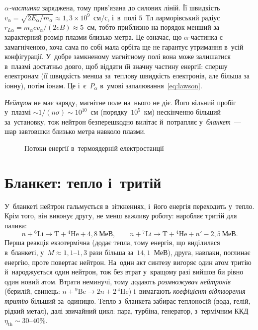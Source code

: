 \emph{$\alpha$-частинка} заряджена, тому прив'язана до силових ліній. Її швидкість
$v_\alpha=\sqrt{2E_\alpha/m_\alpha}\approx1{,}3\times10^{9}$~см/с, і~в~полі $5$~Тл
ларморівський радіус $r_{L\alpha}=m_\alpha cv_\alpha/(2eB)\approx5$~см, тобто приблизно на
порядок менший за характерний розмір плазми близько метра. Це означає, що
$\alpha$-частинка є замагніченою, хоча сама по собі мала орбіта ще не гарантує утримання
в~усій конфігурації. У~добре замкненому магнітному полі вона може залишатися в~плазмі
достатньо довго, щоб віддати їй значну частину енергії: спершу електронам (її швидкість
менша за~теплову швидкість електронів, але більша за іонну), потім іонам. Це
і~є~$P_\alpha$ в~умові запалювання~\eqref{eq:lawson}.

\emph{Нейтрон} не має заряду, магнітне поле на~нього не діє. Його вільний пробіг у~плазмі
$\sim1/(n\sigma)\sim10^{10}$~см (порядку~$10^{5}$~км) нескінченно більший за~установку,
тож нейтрон безперешкодно вилітає й~потрапляє у~\emph{бланкет}~--- шар завтовшки близько
метра навколо плазми.

\begin{figure}[h!]\centering
	\caption{Потоки енергії в~термоядерній електростанції}
	\label{pic:new-energy-flow}
\end{figure}



\section{Бланкет: тепло і~тритій}



У~бланкеті нейтрон гальмується в~зіткненнях, і~його енергія переходить у~тепло. Крім того,
він виконує другу, не менш важливу роботу: наробляє тритій для палива:
\begin{equation*}
	n+{}^6\mathrm{Li}\to\mathrm T+{}^4\mathrm{He}+4{,}8~\text{МеВ},\qquad
	n+{}^7\mathrm{Li}\to\mathrm T+{}^4\mathrm{He}+n'-2{,}5~\text{МеВ}.
\end{equation*}
Перша реакція екзотермічна (додає тепла, тому енергія, що виділилася в~бланкеті,
у~$M\approx1{,}1$--$1{,}3$ рази більша за~$14{,}1$~МеВ), друга, навпаки, поглинає енергію,
проте повертає нейтрон. На~один акт синтезу вигоряє один атом тритію й~народжується один
нейтрон, тож без втрат у~кращому разі вийшов би рівно один новий атом. Втрати неминучі,
тому додають \emph{розмножувач нейтронів} (берилій, свинець:
$n+{}^9\mathrm{Be}\to2n+2\,{}^4\mathrm{He}$) і~вимагають \emph{коефіцієнт відтворення
тритію} більший за~одиницю. Тепло з~бланкета забирає теплоносій (вода, гелій, рідкий
метал), далі звичайний цикл: пара, турбіна, генератор, з~термічним ККД
$\eta_{\mathrm{th}}\sim30$--$40\%$.



